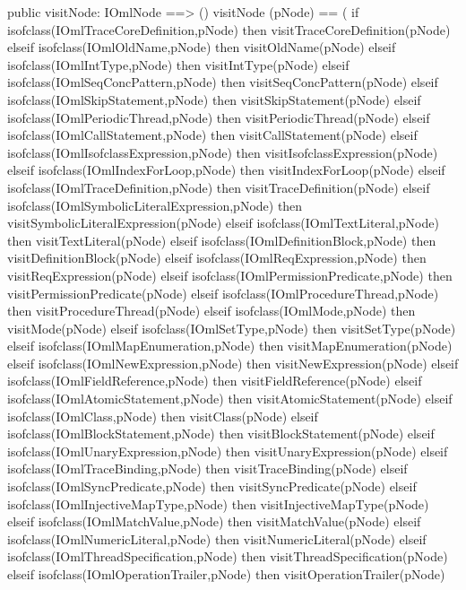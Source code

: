 \begin{vdm_al}
  public visitNode: IOmlNode ==> ()
  visitNode (pNode) ==
    ( if isofclass(IOmlTraceCoreDefinition,pNode) then visitTraceCoreDefinition(pNode)
      elseif isofclass(IOmlOldName,pNode) then visitOldName(pNode)
      elseif isofclass(IOmlIntType,pNode) then visitIntType(pNode)
      elseif isofclass(IOmlSeqConcPattern,pNode) then visitSeqConcPattern(pNode)
      elseif isofclass(IOmlSkipStatement,pNode) then visitSkipStatement(pNode)
      elseif isofclass(IOmlPeriodicThread,pNode) then visitPeriodicThread(pNode)
      elseif isofclass(IOmlCallStatement,pNode) then visitCallStatement(pNode)
      elseif isofclass(IOmlIsofclassExpression,pNode) then visitIsofclassExpression(pNode)
      elseif isofclass(IOmlIndexForLoop,pNode) then visitIndexForLoop(pNode)
      elseif isofclass(IOmlTraceDefinition,pNode) then visitTraceDefinition(pNode)
      elseif isofclass(IOmlSymbolicLiteralExpression,pNode) then visitSymbolicLiteralExpression(pNode)
      elseif isofclass(IOmlTextLiteral,pNode) then visitTextLiteral(pNode)
      elseif isofclass(IOmlDefinitionBlock,pNode) then visitDefinitionBlock(pNode)
      elseif isofclass(IOmlReqExpression,pNode) then visitReqExpression(pNode)
      elseif isofclass(IOmlPermissionPredicate,pNode) then visitPermissionPredicate(pNode)
      elseif isofclass(IOmlProcedureThread,pNode) then visitProcedureThread(pNode)
      elseif isofclass(IOmlMode,pNode) then visitMode(pNode)
      elseif isofclass(IOmlSetType,pNode) then visitSetType(pNode)
      elseif isofclass(IOmlMapEnumeration,pNode) then visitMapEnumeration(pNode)
      elseif isofclass(IOmlNewExpression,pNode) then visitNewExpression(pNode)
      elseif isofclass(IOmlFieldReference,pNode) then visitFieldReference(pNode)
      elseif isofclass(IOmlAtomicStatement,pNode) then visitAtomicStatement(pNode)
      elseif isofclass(IOmlClass,pNode) then visitClass(pNode)
      elseif isofclass(IOmlBlockStatement,pNode) then visitBlockStatement(pNode)
      elseif isofclass(IOmlUnaryExpression,pNode) then visitUnaryExpression(pNode)
      elseif isofclass(IOmlTraceBinding,pNode) then visitTraceBinding(pNode)
      elseif isofclass(IOmlSyncPredicate,pNode) then visitSyncPredicate(pNode)
      elseif isofclass(IOmlInjectiveMapType,pNode) then visitInjectiveMapType(pNode)
      elseif isofclass(IOmlMatchValue,pNode) then visitMatchValue(pNode)
      elseif isofclass(IOmlNumericLiteral,pNode) then visitNumericLiteral(pNode)
      elseif isofclass(IOmlThreadSpecification,pNode) then visitThreadSpecification(pNode)
      elseif isofclass(IOmlOperationTrailer,pNode) then visitOperationTrailer(pNode)

\end{vdm_al}
